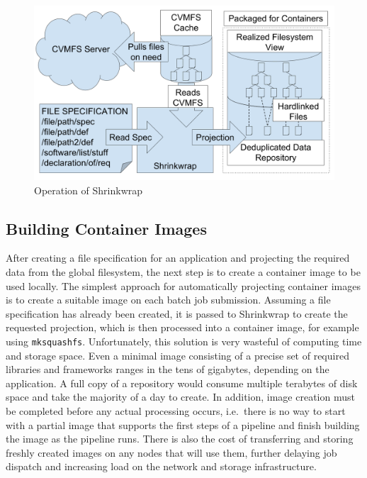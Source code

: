 \documentclass[sigconf]{acmart}
\begin{document}
\begin{figure}[h]
\includegraphics[width=\columnwidth]{drawings/shrinkwrap-structure.png}
\caption{Operation of Shrinkwrap}
\label{figure:shrinkwrap-arch}
\end{figure}


\subsection{Building Container Images}

After creating a file specification for an application and projecting the required data from the global filesystem,
the next step is to create a container image to be used locally.
The simplest approach for automatically projecting container images is to create a suitable image on each batch job submission.
Assuming a file specification has already been created,
it is passed to Shrinkwrap to create the requested projection,
which is then processed into a container image,
for example using \texttt{mksquashfs}.
Unfortunately, this solution is very wasteful of computing time and storage space.
Even a minimal image consisting of a precise set of required libraries and frameworks ranges in the tens of gigabytes,
depending on the application.
A full copy of a repository would consume multiple terabytes of disk space and take the majority of a day to create.
In addition, image creation must be completed before any actual processing occurs,
i.e.\ there is no way to start with a partial image that supports the first steps of a pipeline and finish building the image as the pipeline runs.
There is also the cost of transferring and storing freshly created images on any nodes that will use them,
further delaying job dispatch and increasing load on the network and storage infrastructure.
\end{document}
